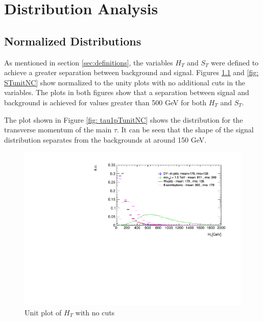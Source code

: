 \chapter{Distribution Analysis} \label{sec: disanalysis}

\section{Normalized Distributions}

As mentioned in section \ref{sec:definitions}, the variables $H_{T}$ and $S_{T}$ were defined to achieve a greater separation between background and signal. Figures \ref{fig: HTunitNC} and \ref{fig: STunitNC} show normalized to the unity plots with no additional cuts in the variables. The plots in both figures show that a separation between signal and background is achieved for values greater than 500 GeV for both $H_{T}$ and $S_{T}$.

The plot shown in Figure \ref{fig: tau1pTunitNC} shows the distribution for the transverse momentum of the main $\tau$. It can be seen that the shape of the signal distribution separates from the backgrounds at around 150 GeV.

\begin{figure}
\centering
\includegraphics[width=1.2\linewidth]{Figures/Plots/HT_unitNoCuts}
\caption{Unit plot of $H_{T}$ with no cuts}
\label{fig: HTunitNC}
\end{figure}

